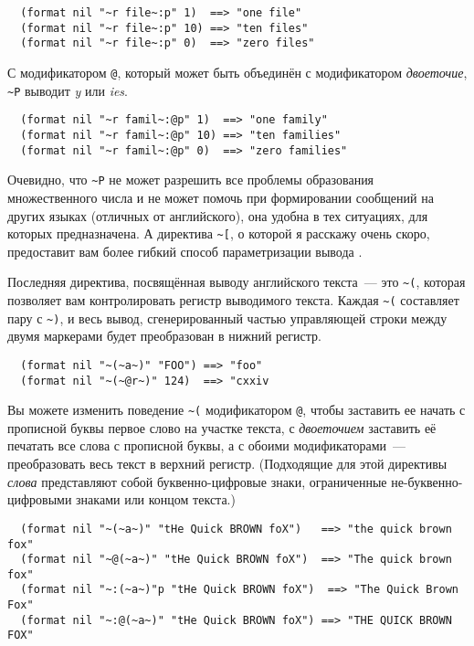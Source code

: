 \begin{verbatim}
  (format nil "~r file~:p" 1)  ==> "one file"
  (format nil "~r file~:p" 10) ==> "ten files"
  (format nil "~r file~:p" 0)  ==> "zero files"
\end{verbatim}

С модификатором \lstinline!@!, который может быть объединён с модификатором
\textit{двоеточие}, \lstinline!~P! выводит \textit{y} или \textit{ies}.

\begin{verbatim}
  (format nil "~r famil~:@p" 1)  ==> "one family"
  (format nil "~r famil~:@p" 10) ==> "ten families"
  (format nil "~r famil~:@p" 0)  ==> "zero families"
\end{verbatim}

Очевидно, что \lstinline!~P! не может разрешить все проблемы образования множественного
числа и не может помочь при формировании сообщений на других языках (отличных от
английского), она удобна в тех ситуациях, для которых предназначена. А директива
\lstinline!~[!, о которой я расскажу очень скоро, предоставит вам более гибкий способ
параметризации вывода .

Последняя директива, посвящённая выводу английского текста~--- это \lstinline!~(!, которая
позволяет вам контролировать регистр выводимого текста. Каждая \lstinline!~(! составляет
пару с \lstinline!~)!, и весь вывод, сгенерированный частью управляющей строки между двумя
маркерами будет преобразован в нижний регистр.

\begin{verbatim}
  (format nil "~(~a~)" "FOO") ==> "foo"
  (format nil "~(~@r~)" 124)  ==> "cxxiv
\end{verbatim}

Вы можете изменить поведение \lstinline!~(! модификатором \lstinline!@!, чтобы заставить
ее начать с прописной буквы первое слово на участке текста, с \textit{двоеточием}
заставить её печатать все слова с прописной буквы, а с обоими модификаторами~---
преобразовать весь текст в верхний регистр. (Подходящие для этой директивы \textit{слова}
представляют собой буквенно-цифровые знаки, ограниченные не-буквенно-цифровыми знаками или
концом текста.)

\begin{verbatim}
  (format nil "~(~a~)" "tHe Quick BROWN foX")   ==> "the quick brown fox"
  (format nil "~@(~a~)" "tHe Quick BROWN foX")  ==> "The quick brown fox"
  (format nil "~:(~a~)"p "tHe Quick BROWN foX")  ==> "The Quick Brown Fox"
  (format nil "~:@(~a~)" "tHe Quick BROWN foX") ==> "THE QUICK BROWN FOX"
\end{verbatim}

